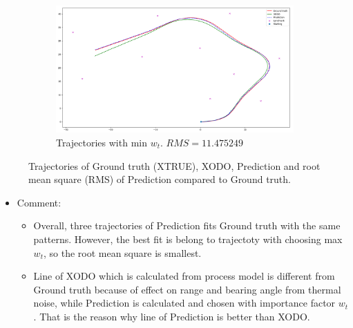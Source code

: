 \documentclass{article}
\begin{document}
\begin{figure}[h!]
\begin{subfigure}[b]{0.7\linewidth}
	\includegraphics[width=\textwidth]{../min.png}
	\caption{Trajectories with min $w_t$. $RMS = 11.475249$}\label{fig:image-3}
\end{subfigure}
\caption{Trajectories of Ground truth (XTRUE), XODO, Prediction and root mean square (RMS) of Prediction compared to Ground truth.}
\end{figure}
\begin{itemize}
	\item{Comment:}
	\begin{itemize}
		\item{Overall, three trajectories of Prediction fits Ground truth with the same patterns. However, the best fit is belong to trajectoty with choosing max $w_t$, so the root mean square is smallest.} 
		\item{Line of XODO which is calculated from process model is different from Ground truth because of effect on range and bearing angle from thermal noise, while Prediction is calculated and chosen with importance factor $w_t$. That is the reason why line of Prediction is better than XODO.}
	\end{itemize}
\end{itemize}
\end{document}
